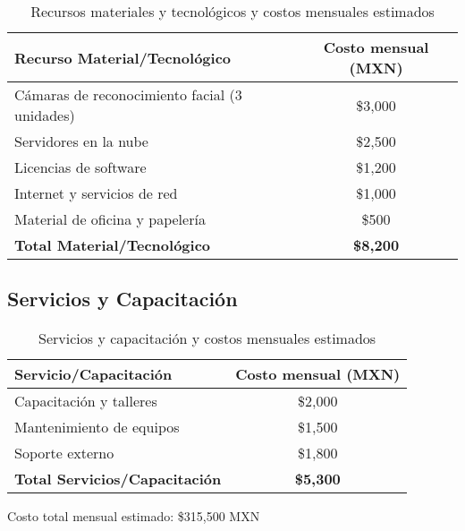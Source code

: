 \begin{table}[h!]
\centering
\footnotesize
\setlength{\tabcolsep}{3.5pt}
\renewcommand{\arraystretch}{0.98}
\begin{tabular}{|l|c|}
\hline
\textbf{Recurso Material/Tecnológico} & \textbf{Costo mensual (MXN)} \\
\hline
Cámaras de reconocimiento facial (3 unidades) & \$3,000 \\
Servidores en la nube & \$2,500 \\
Licencias de software & \$1,200 \\
Internet y servicios de red & \$1,000 \\
Material de oficina y papelería & \$500 \\
\hline
\textbf{Total Material/Tecnológico} & \textbf{\$8,200} \\
\hline
\end{tabular}
\caption{Recursos materiales y tecnológicos y costos mensuales estimados}
\end{table}

\subsection{Servicios y Capacitación}

\begin{table}[h!]
\centering
\footnotesize
\setlength{\tabcolsep}{3.5pt}
\renewcommand{\arraystretch}{0.98}
\begin{tabular}{|l|c|}
\hline
\textbf{Servicio/Capacitación} & \textbf{Costo mensual (MXN)} \\
\hline
Capacitación y talleres & \$2,000 \\
Mantenimiento de equipos & \$1,500 \\
Soporte externo & \$1,800 \\
\hline
\textbf{Total Servicios/Capacitación} & \textbf{\$5,300} \\
\hline
\end{tabular}
\caption{Servicios y capacitación y costos mensuales estimados}
\end{table}

\vspace{0.5cm}
	{Costo total mensual estimado:} \$315,500 MXN